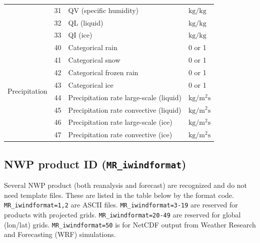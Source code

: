 \documentclass[11pt]{article}   %
\begin{document}
\begin{table}[h]
\begin{tabular}{| r | l | l | l |}
  & 31 & QV (specific humidity) & $\mathrm{kg/kg}$ \\
  & 32 & QL (liquid) & $\mathrm{kg/kg}$ \\
  & 33 & QI (ice) & $\mathrm{kg/kg}$ \\
\hline
\multirow{8}{*}{Precipitation}
  & 40 & Categorical rain & 0 or 1 \\
  & 41 & Categorical snow & 0 or 1 \\
  & 42 & Categorical frozen rain & 0 or 1 \\
  & 43 & Categorical ice & 0 or 1 \\
  & 44 & Precipitation rate large-scale (liquid) & $\mathrm{kg/m^2s}$ \\
  & 45 & Precipitation rate convective  (liquid) & $\mathrm{kg/m^2s}$ \\
  & 46 & Precipitation rate large-scale (ice) & $\mathrm{kg/m^2s}$ \\
  & 47 & Precipitation rate convective  (ice) & $\mathrm{kg/m^2s}$ \\
\hline
\end{tabular}
\normalsize
\end{table}

\clearpage
\subsection{NWP product ID (\texttt{MR\_iwindformat})}\label{Apiwf}
Several NWP product (both reanalysis and forecast) are recognized
and do not need template files.  These are listed in the table below
by the format code.  \texttt{MR\_iwindformat=1,2} are ASCII files.
\texttt{MR\_iwindformat=3-19} are reserved for products with projected grids.
\texttt{MR\_iwindformat=20-49} are reserved for global (lon/lat) grids.
\texttt{MR\_iwindformat=50} is for NetCDF output from Weather Research and 
Forecasting (WRF) simulations.
\end{document}
